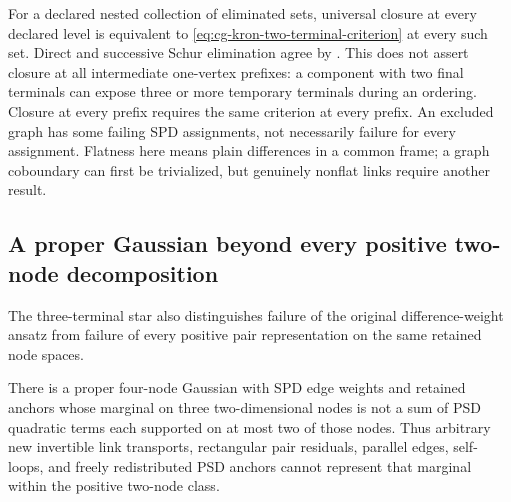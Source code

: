 For a declared nested collection of eliminated sets, universal closure
at every declared level is equivalent to
\eqref{eq:cg-kron-two-terminal-criterion} at every such set.
Direct and successive Schur elimination agree by
. This does not assert closure
at all intermediate one-vertex prefixes: a component with two final
terminals can expose three or more temporary terminals during an
ordering. Closure at every prefix requires the same criterion at
every prefix. An excluded graph has some failing SPD assignments,
not necessarily failure for every assignment. Flatness here means
plain differences in a common frame; a graph coboundary can first
be trivialized, but genuinely nonflat links require another result.

\subsection{A proper Gaussian beyond every positive two-node decomposition}
\label{sec:cg-kron-positive-pair-obstruction}

The three-terminal star also distinguishes failure of the original
difference-weight ansatz from failure of every positive pair
representation on the same retained node spaces.

There is a proper four-node Gaussian with SPD edge weights and
retained anchors whose marginal on three two-dimensional nodes is
not a sum of PSD quadratic terms each supported on at most two
of those nodes. Thus arbitrary new invertible link transports,
rectangular pair residuals, parallel edges, self-loops, and freely
redistributed PSD anchors cannot represent that marginal within
the positive two-node class. 

